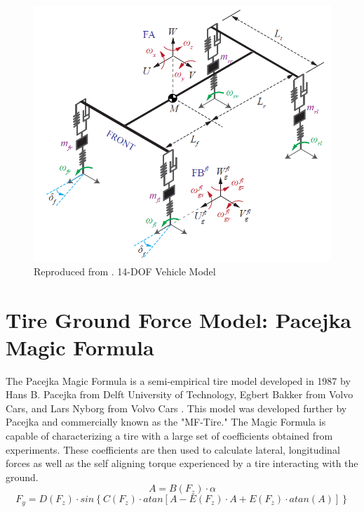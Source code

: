 \documentclass[12pt,onecolumn]{report}
\begin{document}
\begin{figure}
	\centering
	\includegraphics[width=0.8\columnwidth]{Figs/14DOF_Stein.png}
	\caption{\small Reproduced from \protect\cite{RollStudies2007}. 14-DOF Vehicle Model}  
	\label{fig:14DOF}
\end{figure}

\section{Tire Ground Force Model: Pacejka Magic Formula}\label{s:Pacejka}

The Pacejka Magic Formula is a semi-empirical tire model developed in 1987 by Hans B. Pacejka from Delft University of Technology, Egbert Bakker from Volvo Cars, and Lars Nyborg from Volvo Cars \cite{TireSensitivityStudy}. This model was developed further by Pacejka and commercially known as the "MF-Tire." The Magic Formula is capable of characterizing a tire with a large set of coefficients obtained from experiments. These coefficients are then used to calculate lateral, longitudinal forces as well as the self aligning torque experienced by a tire interacting with the ground. 
%
\begin{equation}\label{e:MagicA}
A = B\left(F_z\right)\cdot\alpha 
\end{equation}
\begin{equation}\label{e:MagicLateral}
F_y = D\left(F_z\right)\cdot sin\left\{C\left(F_z\right)\cdot atan\left[A-E\left(F_z\right)\cdot A+E\left(F_z\right)\cdot atan\left(A\right)\right]\right\}
\end{equation}
\end{document}
